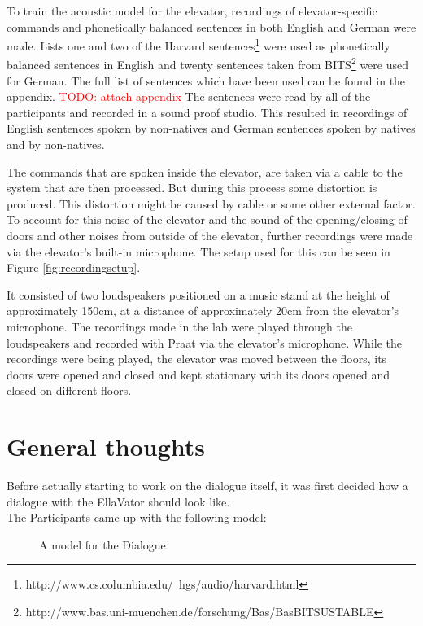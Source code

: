 \documentclass[a4paper, 12pt]{article}
\newcommand\todo[1]{\textcolor{red}{#1}}
\begin{document}
To train the acoustic model for the elevator, recordings of elevator-specific commands and phonetically balanced sentences in both English and German were made. 
Lists one and two  of the Harvard sentences\footnote{http://www.cs.columbia.edu/~hgs/audio/harvard.html} were used as phonetically balanced sentences in English and twenty sentences taken from BITS\footnote{http://www.bas.uni-muenchen.de/forschung/Bas/BasBITSUSTABLE} were used for German. 
The full list of sentences which have been used can be found in the appendix. \todo{TODO: attach appendix} %
The sentences were read by all of the participants and recorded in a sound proof studio. 
This resulted in recordings of English sentences spoken by non-natives and German sentences spoken by natives and by non-natives.


The commands that are spoken inside the elevator, are taken via a cable to the system that are then processed. But during this process some distortion is produced. This distortion might be caused by cable or some other external factor. To account for this noise of the elevator and the sound of the opening/closing of doors and other noises from outside of the elevator, further recordings were made via the elevator's built-in microphone. The setup used for this can be seen in Figure \ref{fig:recordingsetup}.

It consisted of two loudspeakers positioned on a music stand at the height of approximately 150cm, at a distance of approximately 20cm from the elevator's microphone. 
The recordings made in the lab were played through the loudspeakers and recorded with Praat via the elevator's microphone. 
While the recordings were being played, the elevator was moved between the floors, its doors were opened and closed and kept stationary with its doors opened and closed on different floors.

\newpage
\section{General thoughts}
\label{sec:General_thoughts}
Before actually starting to work on the dialogue itself, it was first decided how a dialogue with the EllaVator should look like. \\

The Participants came up with the following model: \\


\begin{figure} [ht]
  \caption{A model for the Dialogue}
  \label{fig: Dialogue flow}
\end{figure}
\end{document}
